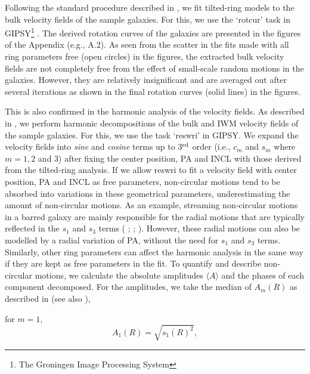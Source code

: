\documentclass[natbib209]{emulateapj}
\begin{document}
Following the standard procedure described in \cite{Begeman_1989}, we fit tilted-ring
models to the bulk velocity fields of the sample galaxies. For this, we use the
`rotcur' task in GIPSY\footnote{The Groningen Image Processing System} \citep{1992ASPC...25..131V}. The
derived rotation curves of the galaxies are
presented in the figures of the Appendix (e.g., A.2). As seen from the scatter
in the fits made with all ring parameters free (open circles) in the figures,
the extracted bulk velocity fields are not completely free from the effect of small-scale random motions in the
galaxies. However, they are relatively insignificant and are averaged out after
several iterations as shown in the final rotation curves (solid lines) in the
figures.

This is also confirmed in the harmonic analysis of the velocity fields.
As described in \cite{Schoenmakers_1997}, we perform harmonic decompositions of
the bulk and IWM velocity fields of the sample galaxies.
For this, we use the task `{\sc reswri}'  in GIPSY. We expand the velocity fields
into {\it sine} and {\it cosine} terms up to  3$^{\rm{rd}}$ order (i.e.,
$c_{m}$ and $s_{m}$ where $m=1, 2$ and $3$) after fixing the center position, PA
and INCL with those derived from the tilted-ring analysis.  
If we allow {\sc reswri} to fit a velocity field with center position, PA
and INCL as free parameters, non-circular motions tend to be absorbed into
variations in these geometrical parameters, underestimating the amount of
non-circular motions. 
As an example, streaming non-circular motions in a barred galaxy are mainly
responsible for the radial motions that are typically reflected in the $s_{1}$ and
$s_{3}$ terms (\citeauthor{Schoenmakers_1997} \citeyear{Schoenmakers_1997};
\citeauthor{Wong_2004} \citeyear{Wong_2004}; \citeauthor{Spekkens_2007}
\citeyear{Spekkens_2007}). However, these radial motions can  also be modelled by a radial
variation of PA, without the need for $s_{1}$ and $s_{3}$ terms. Similarly, other ring parameters
can affect the harmonic analysis in the same way if they are kept as free
parameters in the fit. To quantify and describe non-circular motions, we
calculate the absolute amplitudes $\langle A \rangle$ and the phases of each component
decomposed. For the amplitudes, we take the median of
$A_m(R)$ as described in \cite{Schoenmakers_1997} (see also
\citeauthor{Trachternach_2008} \citeyear{Trachternach_2008}),

for $m=1$, 
\begin{equation}
\label{eq:1}
A_1(R)=\sqrt{s_1(R)^2},
\end{equation}
\end{document}
